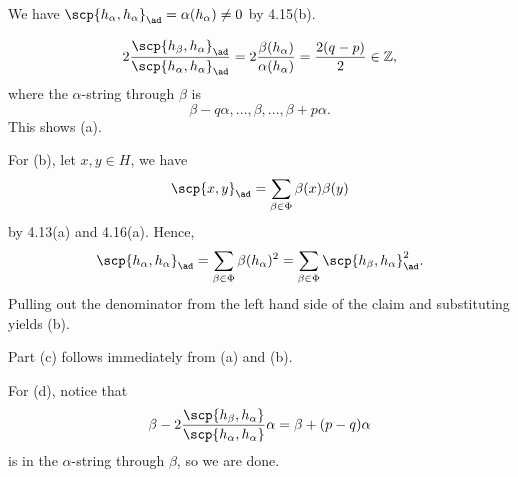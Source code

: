 We have $\scp{h_\alpha, h_\alpha}_{\ad} = \alpha(h_\alpha) \neq 0$ by 4.15(b).

\[ 2 \frac{\scp{h_\beta, h_\alpha}_{\ad}}{\scp{h_\alpha, h_\alpha}_{\ad}}
= 2\frac{\beta(h_\alpha)}{\alpha(h_\alpha)} = \frac{2(q-p)}{2} \in \mathbb{Z}, \]
where the $\alpha$-string through $\beta$ is
\[ \beta-q\alpha, \ldots, \beta, \ldots, \beta+p\alpha. \]
This shows (a).

For (b), let $x, y \in H$, we have
\[ \scp{x, y}_{\ad} = \sum_{\beta \in \Phi} \beta(x)\beta(y) \]
by 4.13(a) and 4.16(a).
Hence,
\[ \scp{h_\alpha, h_\alpha}_{\ad} = \sum_{\beta \in \Phi} \beta(h_\alpha)^2 = \sum_{\beta \in \Phi}\scp{h_\beta, h_\alpha}_{\ad}^2. \]
Pulling out the denominator from the left hand side of the claim and substituting
yields (b).

Part (c) follows immediately from (a) and (b).

For (d), notice that
\[ \beta - 2\frac{\scp{h_\beta, h_\alpha}}{\scp{h_\alpha, h_\alpha}}\alpha = \beta + (p-q)\alpha \]
is in the $\alpha$-string through $\beta$, so we are done.

